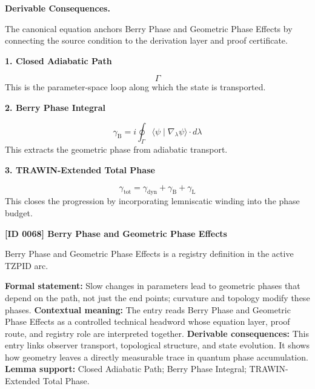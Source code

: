 \par\vspace{0.35em}
\noindent\textbf{Derivable Consequences.}\quad
\begingroup
\footnotesize
\raggedright
The canonical equation anchors Berry Phase and Geometric Phase Effects by connecting the source condition to the derivation layer and proof certificate.
\par\endgroup

\noindent\textbf{1. Closed Adiabatic Path}\par
\[
\Gamma
\]
\noindent This is the parameter-space loop along which the state is transported.\par
\noindent\textbf{2. Berry Phase Integral}\par
\[
\gamma_{\mathrm{B}}
=
i\oint_{\Gamma}\langle \psi \mid \nabla_{\lambda}\psi\rangle\cdot d\lambda
\]
\noindent This extracts the geometric phase from adiabatic transport.\par
\noindent\textbf{3. TRAWIN-Extended Total Phase}\par
\[
\gamma_{\mathrm{tot}}
=
\gamma_{\mathrm{dyn}} + \gamma_{\mathrm{B}} + \gamma_{\mathrm{L}}
\]
\noindent This closes the progression by incorporating lemniscatic winding into the phase budget.\par

\clearpage
\noindent\textbf{[ID 0068] Berry Phase and Geometric Phase Effects}\par
\vspace{0.35em}
\begingroup\small
{}
Berry Phase and Geometric Phase Effects is a registry definition in the active TZPID arc.

\begingroup\footnotesize\setlength{\emergencystretch}{3em}\sloppy
\textbf{Formal statement:} Slow changes in parameters lead to geometric phases that depend on the path, not just the end points; curvature and topology modify these phases. \textbf{Contextual meaning:} The entry reads Berry Phase and Geometric Phase Effects as a controlled technical headword whose equation layer, proof route, and registry role are interpreted together. \textbf{Derivable consequences:} This entry links observer transport, topological structure, and state evolution. It shows how geometry leaves a directly measurable trace in quantum phase accumulation. \textbf{Lemma support:} Closed Adiabatic Path; Berry Phase Integral; TRAWIN-Extended Total Phase.\par
\endgroup

